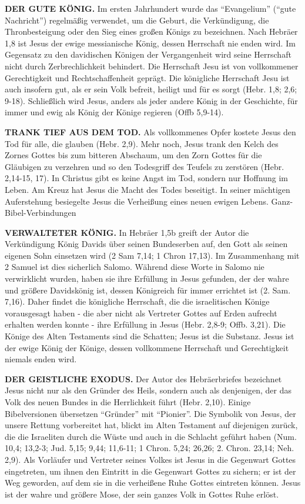 \documentclass[]{book}
\begin{document}
\textbf{DER GUTE KÖNIG.} Im ersten Jahrhundert wurde das ``Evangelium''
(``gute Nachricht'') regelmäßig verwendet, um die Geburt, die
Verkündigung, die Thronbesteigung oder den Sieg eines großen Königs zu
bezeichnen. Nach Hebräer 1,8 ist Jesus der ewige messianische König,
dessen Herrschaft nie enden wird. Im Gegensatz zu den davidischen
Königen der Vergangenheit wird seine Herrschaft nicht durch
Zerbrechlichkeit behindert. Die Herrschaft Jesu ist von vollkommener
Gerechtigkeit und Rechtschaffenheit geprägt. Die königliche Herrschaft
Jesu ist auch insofern gut, als er sein Volk befreit, heiligt und für es
sorgt (Hebr. 1,8; 2,6; 9-18). Schließlich wird Jesus, anders als jeder
andere König in der Geschichte, für immer und ewig als König der Könige
regieren (Offb 5,9-14).

\textbf{TRANK TIEF AUS DEM TOD.} Als vollkommenes Opfer kostete Jesus
den Tod für alle, die glauben (Hebr. 2,9). Mehr noch, Jesus trank den
Kelch des Zornes Gottes bis zum bitteren Abschaum, um den Zorn Gottes
für die Gläubigen zu verzehren und so den Todesgriff des Teufels zu
zerstören (Hebr. 2,14-15, 17). In Christus gibt es keine Angst im Tod,
sondern nur Hoffnung im Leben. Am Kreuz hat Jesus die Macht des Todes
beseitigt. In seiner mächtigen Auferstehung besiegelte Jesus die
Verheißung eines neuen ewigen Lebens. Ganz-Bibel-Verbindungen

\textbf{VERWALTETER KÖNIG.} In Hebräer 1,5b greift der Autor die
Verkündigung König Davids über seinen Bundeserben auf, den Gott als
seinen eigenen Sohn einsetzen wird (2 Sam 7,14; 1 Chron 17,13). Im
Zusammenhang mit 2 Samuel ist dies sicherlich Salomo. Während diese
Worte in Salomo nie verwirklicht wurden, haben sie ihre Erfüllung in
Jesus gefunden, der der wahre und größere Davidskönig ist, dessen
Königreich für immer errichtet ist (2. Sam. 7,16). Daher findet die
königliche Herrschaft, die die israelitischen Könige vorausgesagt haben
- die aber nicht als Vertreter Gottes auf Erden aufrecht erhalten werden
konnte - ihre Erfüllung in Jesus (Hebr. 2,8-9; Offb. 3,21). Die Könige
des Alten Testaments sind die Schatten; Jesus ist die Substanz. Jesus
ist der ewige König der Könige, dessen vollkommene Herrschaft und
Gerechtigkeit niemals enden wird.

\textbf{DER GEISTLICHE EXODUS.} Der Autor des Hebräerbriefes bezeichnet
Jesus nicht nur als den Gründer des Heils, sondern auch als denjenigen,
der das Volk des neuen Bundes in die Herrlichkeit führt (Hebr. 2,10).
Einige Bibelversionen übersetzen ``Gründer'' mit ``Pionier''. Die
Symbolik von Jesus, der unsere Rettung vorbereitet hat, blickt im Alten
Testament auf diejenigen zurück, die die Israeliten durch die Wüste und
auch in die Schlacht geführt haben (Num. 10,4; 13,2-3; Jud. 5,15; 9,44;
11,6-11; 1 Chron. 5,24; 26,26; 2. Chron. 23,14; Neh. 2,9). Als Vorläufer
und Vertreter seines Volkes ist Jesus in die Gegenwart Gottes
eingetreten, um ihnen den Eintritt in die Gegenwart Gottes zu sichern;
er ist der Weg geworden, auf dem sie in die verheißene Ruhe Gottes
eintreten können. Jesus ist der wahre und größere Mose, der sein ganzes
Volk in Gottes Ruhe erlöst.
\end{document}

